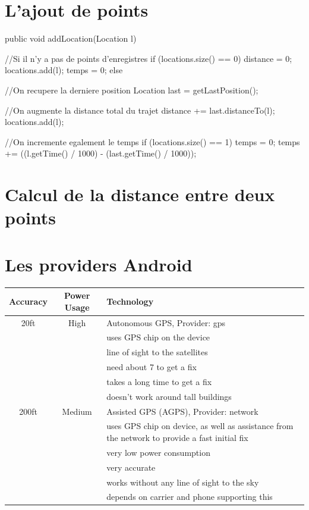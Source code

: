 \begin{appendices}
\chapter{L'ajout de points}

\label{Annexe1}
\begin{java}  
public void addLocation(Location l) {
	//Si il n'y a pas de points d'enregistres
	if (locations.size() == 0) {
		distance = 0;
		locations.add(l);
		temps = 0;
	} else {
	
	//On recupere la derniere position 
	Location last = getLastPosition();
	
	//On augmente la distance total du trajet 
	distance += last.distanceTo(l);
	locations.add(l);
 	
 	//On incremente egalement le temps 
	if (locations.size() == 1) {
		temps = 0;
	} 
	temps += ((l.getTime() / 1000) - (last.getTime() / 1000));   
	}
}
\end{java}

\chapter{Calcul de la distance entre deux points}
\label{Annexe2}

\chapter{Les providers Android}
\label{Annexe3}
\begin{center}
   \begin{tabular}{| c | c | l | }
     \hline
     Accuracy & Power Usage & Technology \\ \hline
     20ft & High & Autonomous GPS, Provider: gps \\ 
     && uses GPS chip on the device \\
     && line of sight to the satellites \\
     && need about 7 to get a fix \\
     && takes a long time to get a fix \\
     && doesn’t work around tall buildings \\ \hline
 
     200ft & Medium & Assisted GPS (AGPS), Provider: network \\ 
     && uses GPS chip on device, as well as assistance from the network to provide a fast initial fix \\
	 && very low power consumption \\
	 && very accurate \\
	 && works without any line of sight to the sky \\
	 && depends on carrier and phone supporting this \\ \hline
    

\end{tabular}
\end{center}
\end{appendices}
